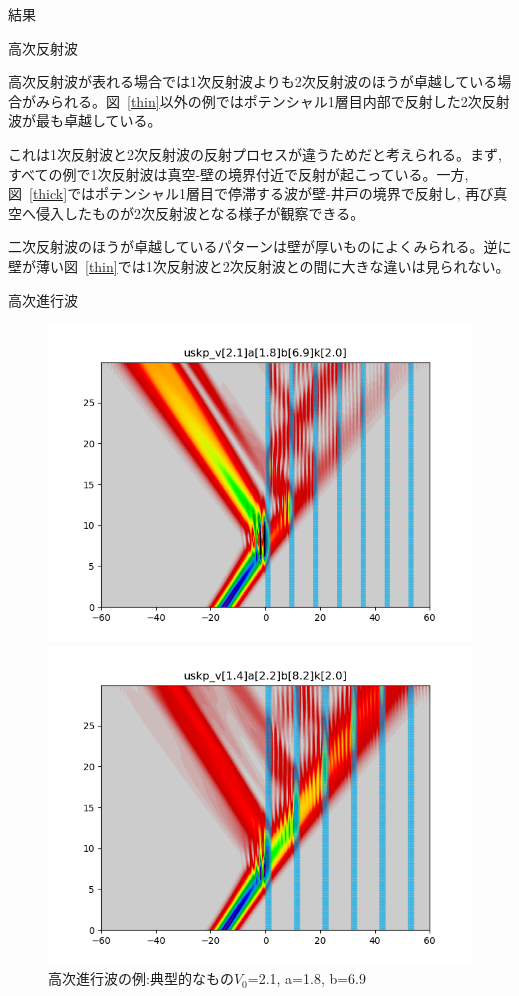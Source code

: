 \documentclass[a4paper, lualatex]{bxjsarticle}
\newcommand{\fref}[1]{図~\ref{#1}}
\begin{document}
\begin{section}{結果}
\begin{subsection}{高次反射波}
    \par 高次反射波が表れる場合では1次反射波よりも2次反射波のほうが卓越している場合がみられる。\fref{thin}以外の例ではポテンシャル1層目内部で反射した2次反射波が最も卓越している。
    \par これは1次反射波と2次反射波の反射プロセスが違うためだと考えられる。まず, すべての例で1次反射波は真空-壁の境界付近で反射が起こっている。一方, \fref{thick}ではポテンシャル1層目で停滞する波が壁-井戸の境界で反射し, 再び真空へ侵入したものが2次反射波となる様子が観察できる。
    \par 二次反射波のほうが卓越しているパターンは壁が厚いものによくみられる。逆に壁が薄い\fref{thin}では1次反射波と2次反射波との間に大きな違いは見られない。
    \end{subsection}

    \begin{subsection}{高次進行波}
        \begin{figure}[h]
            \begin{minipage}{0.5\hsize}
                \centering
                \includegraphics[width=0.9\hsize]{tajushin1.png}
                \caption{高次進行波の例:典型的なもの$V_0$=2.1, a=1.8, b=6.9}
                \label{temporal}
            \end{minipage}
            \begin{minipage}{0.5\hsize}
                \centering
                \includegraphics[width=0.9\hsize]{tajushin2.png}

\end{minipage}
\end{figure}
\end{subsection}
\end{section}
\end{document}
